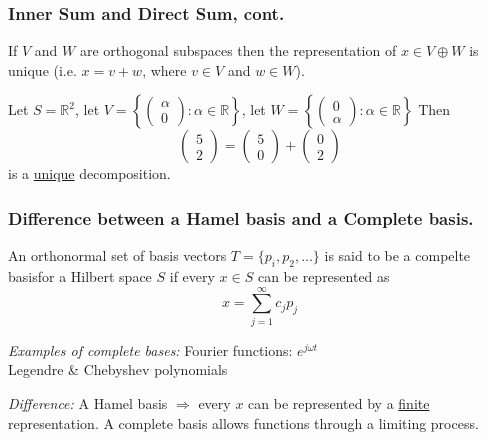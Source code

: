 \documentclass{beamer}
\begin{document}
\begin{frame}\frametitle{Inner Sum and Direct Sum, cont.}
\begin{lemma}
  If $V$ and $W$ are orthogonal subspaces then the representation of
  $x \in V \oplus W$ is unique (i.e. $x = v+w$, where $v\in V$ and $w\in W$).
\end{lemma}
\begin{example}
Let $S = \mathbb{R}^2$, let $V =
\left\{\left( \begin{array}{c} \alpha \\ 0 \end{array} \right) :
  \alpha \in \mathbb{R} \right\}$, let $W = \left\{ \left( \begin{array}{c} 0
      \\ \alpha \end{array} \right) : \alpha \in \mathbb{R} \right\}$ Then
\[ \left(\begin{array}{c} 5 \\ 2 \end{array}\right) =
\left( \begin{array}{c} 5 \\ 0 \end{array} \right) +
\left( \begin{array}{c} 0 \\ 2 \end{array} \right) \] is a
\underline{unique} decomposition.
\end{example}
\end{frame}

\begin{frame}\frametitle{Difference between a Hamel basis and a Complete basis.}
\begin{definition}	
An orthonormal set of basis vectors $T = \{ p_i,
p_2, \ldots \}$ is said to be a compelte basisfor a Hilbert space $S$
if every $x \in S$ can be represented as
\[ x = \sum_{j=1}^{\infty}c_j p_j \]	
\end{definition}

\vfill

{\em Examples of complete bases:}
Fourier functions: $e^{j\omega t}$\\
Legendre \& Chebyshev polynomials

\vfill

{\em Difference:} A Hamel basis $\Rightarrow$ every $x$ can be
represented by a \underline{finite} representation.  A complete basis
allows functions through a limiting process.

\end{frame}
\end{document}
